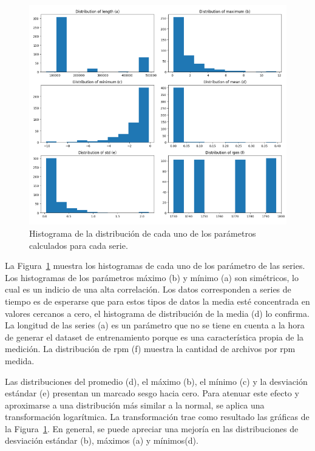 \documentclass[11pt,a4paper,spanish]{book}
\numberwithin{equation}{chapter}
\numberwithin{figure}{chapter}
\begin{document}
\begin{figure}[h]
    \centering
    \includegraphics[width=1\textwidth]{media/dataset/histogram-01.png}
    \caption{Histograma de la distribución de cada uno de los parámetros calculados para cada serie. }
    \label{fig:figHistogram01}
\end{figure}


La Figura~\ref{fig:figHistogram01} muestra los histogramas de cada uno de los parámetro de las series. Los histogramas de los parámetros máximo (b) y mínimo (a) son simétricos, lo cual es un indicio de una alta correlación. Los datos corresponden a series de tiempo es de esperarse que para estos tipos de datos la media esté concentrada en valores cercanos a cero, el histograma de distribución de la media (d) lo confirma. La longitud de las series (a) es un parámetro que no se tiene en cuenta a la hora de generar el dataset de entrenamiento porque es una característica propia de la medición. La distribución de rpm (f) muestra la cantidad de archivos por rpm medida.    


Las distribuciones del promedio (d), el máximo (b), el mínimo (c) y la desviación estándar (e) presentan un marcado sesgo hacia cero. Para atenuar este efecto y aproximarse a una distribución más similar a la normal, se aplica una transformación logarítmica. La transformación trae como resultado las gráficas de la Figura~\ref{fig:figHistogram01}. En general, se puede apreciar una mejoría en las distribuciones de desviación estándar (b), máximos (a) y mínimos(d). 
\end{document}
